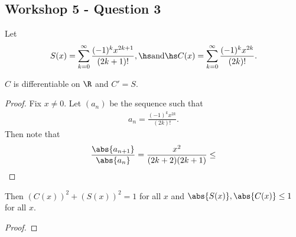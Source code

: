\documentclass{article}
\begin{document}
\subsection*{Workshop 5 - Question 3}

Let
\begin{align*}
   S(x) =\sum_{k=0}^\infty \frac{(-1)^k x^{2k+1}}{(2k+1)!},\hs \text{and}\hs
   C(x) = \sum_{k=0}^\infty \frac{(-1)^k x^{2k}}{(2k)!}.
\end{align*}

\begin{claim*}
   $C$ is differentiable on $\R$ and $C'=S$.
\end{claim*}
\begin{proof}
   Fix $x\not=0$. Let $(a_n)$ be the sequence such that
   \begin{align*}
      a_n = \frac{(-1)^{k}x^{2k}}{(2k)!}.
   \end{align*}
   Then note that
   \begin{align*}
      \frac{\abs{a_{n+1}}}{\abs{a_n}} = \frac{x^2}{(2k+2)(2k+1)} \leq 
   \end{align*}
\end{proof}

\begin{claim*}
   Then $(C(x))^2 + (S(x))^2 = 1$ for all $x$ and $\abs{S(x)},\abs{C(x)}\leq 1$ 
   for all $x$.
\end{claim*}

\begin{proof}
   
\end{proof}
\end{document}

